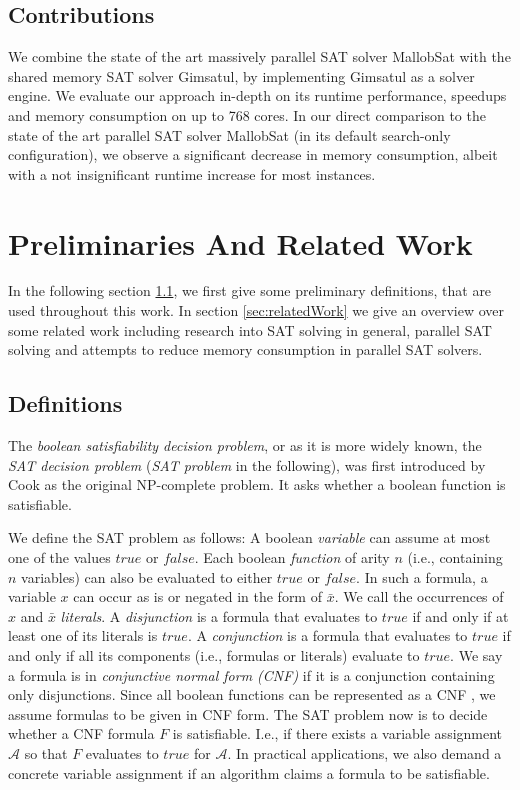 \documentclass[12pt,a4paper,twoside]{scrartcl}
\numberwithin{equation}{section}
\begin{document}
\subsection{Contributions}

We combine the state of the art massively parallel SAT solver MallobSat with the shared memory SAT solver Gimsatul, by implementing Gimsatul as a solver engine. We evaluate our approach in-depth on its runtime performance, speedups and memory consumption on up to 768 cores. In our direct comparison to the state of the art parallel SAT solver MallobSat (in its default search-only configuration), we observe a significant decrease in memory consumption, albeit with a not insignificant runtime increase for most instances.


\section{Preliminaries And Related Work}

In the following section \ref{sec:definitions}, we first give some preliminary definitions, that are used throughout this work. In section \ref{sec:relatedWork} we give an overview over some related work including research into SAT solving in general, parallel SAT solving and attempts to reduce memory consumption in parallel SAT solvers.

\subsection{Definitions}
\label{sec:definitions}

The \textit{boolean satisfiability decision problem}, or as it is more widely known, the \textit{SAT decision problem} (\textit{SAT problem} in the following), was first introduced by Cook \cite{satProblem} as the original NP-complete problem. It asks whether a boolean function is satisfiable.

We define the SAT problem as follows:
A boolean \textit{variable} can assume at most one of the values $true$ or $false$. Each boolean \textit{function} of arity $n$ (i.e., containing $n$ variables) can also be evaluated to either $true$ or $false$. In such a formula, a variable $x$ can occur as is or negated in the form of $\bar{x}$. We call the occurrences of $x$ and $\bar{x}$ \textit{literals}. A \textit{disjunction} is a formula that evaluates to $true$ if and only if at least one of its literals is $true$. A \textit{conjunction} is a formula that evaluates to $true$ if and only if all its components (i.e., formulas or literals) evaluate to $true$. We say a formula is in \textit{conjunctive normal form (CNF)} if it is a conjunction containing only disjunctions. Since all boolean functions can be represented as a CNF \cite{cnfPaper}, we assume formulas to be given in CNF form. 
The SAT problem now is to decide whether a CNF formula $F$ is satisfiable. I.e., if there exists a variable assignment $\mathcal{A}$ so that $F$ evaluates to $true$ for $\mathcal{A}$. In practical applications, we also demand a concrete variable assignment if an algorithm claims a formula to be satisfiable.
\end{document}
